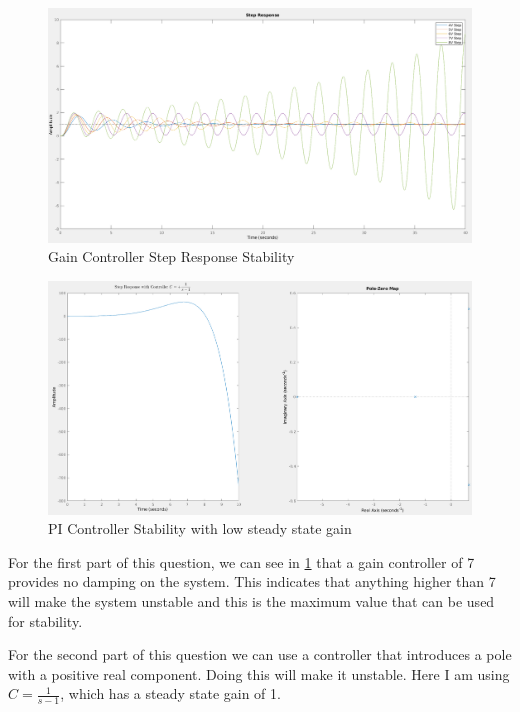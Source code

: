 \documentclass[a4paper, 12pt]{article}
\begin{document}
        

        \begin{figure}[!h]
            \centering
            \includegraphics[width=\textwidth]{q5.png}
            \caption{Gain Controller Step Response Stability}
            \label{fig:q5a}
        \end{figure}

        \begin{figure}[!h]
            \centering
            \includegraphics[width=\textwidth]{q5b.png}
            \caption{PI Controller Stability with low steady state gain}
            \label{fig:q5b}
        \end{figure}

        For the first part of this question, we can see in \cref{fig:q5a} that a gain controller of 7 provides no damping on the system. This indicates that anything higher than 7 will make the system unstable and this is the maximum value that can be used for stability.
        \par
        For the second part of this question we can use a controller that introduces a pole with a positive real component. Doing this will make it unstable. Here I am using $C = \frac{1}{s-1}$, which has a steady state gain of 1.
        
\end{document}
